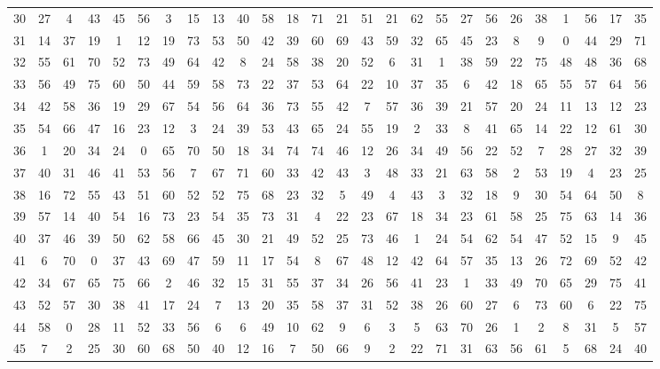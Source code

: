 \begin{table}
\begin{tabular}{c c c c c c c c c c c c c c c c c c c c c c c c c c }
30 & 27 & 4 & 43 & 45 & 56 & 3 & 15 & 13 & 40 & 58 & 18 & 71 & 21 & 51 & 21 & 62 & 55 & 27 & 56 & 26 & 38 & 1 & 56 & 17 & 35 \\
31 & 14 & 37 & 19 & 1 & 12 & 19 & 73 & 53 & 50 & 42 & 39 & 60 & 69 & 43 & 59 & 32 & 65 & 45 & 23 & 8 & 9 & 0 & 44 & 29 & 71 \\
32 & 55 & 61 & 70 & 52 & 73 & 49 & 64 & 42 & 8 & 24 & 58 & 38 & 20 & 52 & 6 & 31 & 1 & 38 & 59 & 22 & 75 & 48 & 48 & 36 & 68 \\
33 & 56 & 49 & 75 & 60 & 50 & 44 & 59 & 58 & 73 & 22 & 37 & 53 & 64 & 22 & 10 & 37 & 35 & 6 & 42 & 18 & 65 & 55 & 57 & 64 & 56 \\
34 & 42 & 58 & 36 & 19 & 29 & 67 & 54 & 56 & 64 & 36 & 73 & 55 & 42 & 7 & 57 & 36 & 39 & 21 & 57 & 20 & 24 & 11 & 13 & 12 & 23 \\
35 & 54 & 66 & 47 & 16 & 23 & 12 & 3 & 24 & 39 & 53 & 43 & 65 & 24 & 55 & 19 & 2 & 33 & 8 & 41 & 65 & 14 & 22 & 12 & 61 & 30 \\
36 & 1 & 20 & 34 & 24 & 0 & 65 & 70 & 50 & 18 & 34 & 74 & 74 & 46 & 12 & 26 & 34 & 49 & 56 & 22 & 52 & 7 & 28 & 27 & 32 & 39 \\
37 & 40 & 31 & 46 & 41 & 53 & 56 & 7 & 67 & 71 & 60 & 33 & 42 & 43 & 3 & 48 & 33 & 21 & 63 & 58 & 2 & 53 & 19 & 4 & 23 & 25 \\
38 & 16 & 72 & 55 & 43 & 51 & 60 & 52 & 52 & 75 & 68 & 23 & 32 & 5 & 49 & 4 & 43 & 3 & 32 & 18 & 9 & 30 & 54 & 64 & 50 & 8 \\
39 & 57 & 14 & 40 & 54 & 16 & 73 & 23 & 54 & 35 & 73 & 31 & 4 & 22 & 23 & 67 & 18 & 34 & 23 & 61 & 58 & 25 & 75 & 63 & 14 & 36 \\
40 & 37 & 46 & 39 & 50 & 62 & 58 & 66 & 45 & 30 & 21 & 49 & 52 & 25 & 73 & 46 & 1 & 24 & 54 & 62 & 54 & 47 & 52 & 15 & 9 & 45 \\
41 & 6 & 70 & 0 & 37 & 43 & 69 & 47 & 59 & 11 & 17 & 54 & 8 & 67 & 48 & 12 & 42 & 64 & 57 & 35 & 13 & 26 & 72 & 69 & 52 & 42 \\
42 & 34 & 67 & 65 & 75 & 66 & 2 & 46 & 32 & 15 & 31 & 55 & 37 & 34 & 26 & 56 & 41 & 23 & 1 & 33 & 49 & 70 & 65 & 29 & 75 & 41 \\
43 & 52 & 57 & 30 & 38 & 41 & 17 & 24 & 7 & 13 & 20 & 35 & 58 & 37 & 31 & 52 & 38 & 26 & 60 & 27 & 6 & 73 & 60 & 6 & 22 & 75 \\
44 & 58 & 0 & 28 & 11 & 52 & 33 & 56 & 6 & 6 & 49 & 10 & 62 & 9 & 6 & 3 & 5 & 63 & 70 & 26 & 1 & 2 & 8 & 31 & 5 & 57 \\
45 & 7 & 2 & 25 & 30 & 60 & 68 & 50 & 40 & 12 & 16 & 7 & 50 & 66 & 9 & 2 & 22 & 71 & 31 & 63 & 56 & 61 & 5 & 68 & 24 & 40 \\

\end{tabular}
\end{table}
